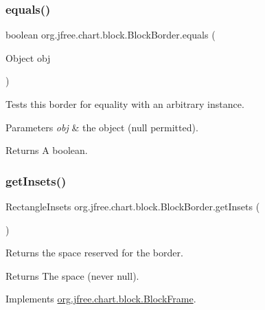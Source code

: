 \subsubsection{\texorpdfstring{equals()}{equals()}}
{\footnotesize\ttfamily boolean org.\+jfree.\+chart.\+block.\+Block\+Border.\+equals (\begin{DoxyParamCaption}\item[{Object}]{obj }\end{DoxyParamCaption})}

Tests this border for equality with an arbitrary instance.


\begin{DoxyParams}{Parameters}
{\em obj} & the object ({\ttfamily null} permitted).\\
\hline
\end{DoxyParams}
\begin{DoxyReturn}{Returns}
A boolean. 
\end{DoxyReturn}
\mbox{\label{classorg_1_1jfree_1_1chart_1_1block_1_1_block_border_a4507b8ff587d8d3f75ffa5e4996e19c2}} 
\subsubsection{\texorpdfstring{get\+Insets()}{getInsets()}}
{\footnotesize\ttfamily Rectangle\+Insets org.\+jfree.\+chart.\+block.\+Block\+Border.\+get\+Insets (\begin{DoxyParamCaption}{ }\end{DoxyParamCaption})}

Returns the space reserved for the border.

\begin{DoxyReturn}{Returns}
The space (never {\ttfamily null}). 
\end{DoxyReturn}


Implements \mbox{\hyperlink{interfaceorg_1_1jfree_1_1chart_1_1block_1_1_block_frame_ae85aa6f391781ca53ae5b4671b6d1154}{org.\+jfree.\+chart.\+block.\+Block\+Frame}}.

\mbox{\label{classorg_1_1jfree_1_1chart_1_1block_1_1_block_border_a0b48caa217926ee928eca1c146d6e523}} 
